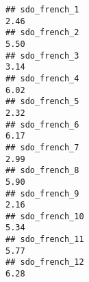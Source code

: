 \documentclass[
]{article}
\begin{document}
\begin{verbatim}
## sdo_french_1                                                                                                                                                                                                                  2.46
## sdo_french_2                                                                                                                                                                                                                  5.50
## sdo_french_3                                                                                                                                                                                                                  3.14
## sdo_french_4                                                                                                                                                                                                                  6.02
## sdo_french_5                                                                                                                                                                                                                  2.32
## sdo_french_6                                                                                                                                                                                                                  6.17
## sdo_french_7                                                                                                                                                                                                                  2.99
## sdo_french_8                                                                                                                                                                                                                  5.90
## sdo_french_9                                                                                                                                                                                                                  2.16
## sdo_french_10                                                                                                                                                                                                                 5.34
## sdo_french_11                                                                                                                                                                                                                 5.77
## sdo_french_12                                                                                                                                                                                                                 6.28

\end{verbatim}
\end{document}
